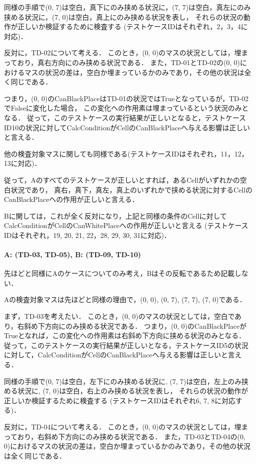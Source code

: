 \documentclass[platex,dvipdfmx,12pt]{jsarticle}
\begin{document}
同様の手順で(0, 7)は空白，真下にのみ挟める状況に，(7, 7)は空白，真左にのみ挟める状況に，(7, 0)は空白，真上にのみ挟める状況を表し，
それらの状況の動作が正しいか検証するために検査する
(テストケースIDはそれぞれ，2，3，4に対応)．

反対に，TD-02について考える．
このとき，(0, 0)のマスの状況としては，埋まっており，真右方向にのみ挟める状況である．
また，TD-01とTD-02の(0, 0)におけるマスの状況の差は，空白か埋まっているかのみであり，その他の状況は全く同じである．

つまり，(0, 0)のCanBlackPlaceはTD-01の状況ではTrueとなっているが，TD-02でFalseに変化した場合，
この変化への作用素は埋まっているという状況のみとなる．
従って，このテストケースの実行結果が正しいとなると，テストケースID10の状況に対してCalcConditionがCellのCanBlackPlaceへ与える影響は正しいと言える．

他の検査対象マスに関しても同様である(テストケースIDはそれぞれ，11，12，13に対応)．


従って，Aのすべてのテストケースが正しいとすれば，あるCellがいずれかの空白状況であり，
真右，真下，真左，真上のいずれかで挟める状況に対するCellのCanBlackPlaceへの作用が正しいと言える．

Bに関しては，これが全く反対になり，上記と同様の条件のCellに対してCalcConditionがCellのCanWhitePlaceへの作用が正しいと言える
(テストケースIDはそれぞれ，19, 20, 21, 22，28, 29, 30, 31に対応)．


\paragraph{A: (TD-03, TD-05), B: (TD-09, TD-10)}
先ほどと同様にAのケースについてのみ考え，Bはその反転であるため記載しない．

Aの検査対象マスは先ほどと同様の理由で，(0, 0), (0, 7), (7, 7), (7, 0)である．

まず，TD-03を考えたい．
このとき，(0, 0)のマスの状況としては，空白であり，右斜め下方向にのみ挟める状況である．
つまり，(0, 0)のCanBlackPlaceがTrueとなれば，この変化への作用素は右斜め下方向に挟める状況のみとなる．
従って，このテストケースの実行結果が正しいとなる，テストケースID5の状況に対して，CalcConditionがCellのCanBlackPlaceへ与える影響は正しいと言える．

同様の手順で(0, 7)は空白，左下にのみ挟める状況に, (7, 7)は空白，左上のみ挟める状況に, (7, 0)は空白，右上のみ挟める状況を表し，
それらの状況の動作が正しいか検証するために検査する
(テストケースIDはそれぞれ6, 7, 8に対応する)．

反対に，TD-04について考える．
このとき，(0, 0)のマスの状況としては，埋まっており，右斜め下方向にのみ挟める状況である．
また，TD-03とTD-04の(0, 0)におけるマスの状況の差は，空白か埋まっているかのみであり，その他の状況は全く同じである．
\end{document}
